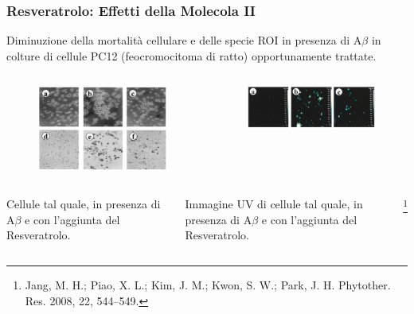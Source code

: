 \documentclass[9pt]{beamer}
\newcommand\blfootnote[1]{%
	\begingroup
	\renewcommand\thefootnote{}\footnote{#1}%
	\addtocounter{footnote}{-1}%
	\endgroup
}
\begin{document}
\begin{frame}
	\frametitle{Resveratrolo: Effetti della Molecola II}
	
	Diminuzione della mortalità cellulare e delle specie ROI in presenza di A$\beta$ in colture di cellule PC12 (feocromocitoma di ratto) opportunamente trattate.
	\begin{columns}
		\begin{column}{0.5\textwidth}
			\begin{figure}
				\includegraphics[width=\textwidth]{immagini/apo_resveratrolo.png}
			\end{figure}
		\end{column}
		\begin{column}{0.5\textwidth}
			\begin{figure}
				\includegraphics[width=\textwidth]{immagini/roi_resveratrolo.png}
			\end{figure}
		\end{column}
	\end{columns}
	\medskip
	\begin{columns}
		\begin{column}{0.5\textwidth}
			Cellule tal quale, in presenza di A$\beta$ e con l'aggiunta del Resveratrolo.
		\end{column}
		\begin{column}{0.5\textwidth}
			Immagine UV di cellule tal quale, in presenza di A$\beta$ e con l'aggiunta del Resveratrolo.
		\end{column}
		\blfootnote{Jang, M. H.; Piao, X. L.; Kim, J. M.; Kwon, S. W.; Park, J. H.
			Phytother. Res. 2008, 22, 544–549.}
	\end{columns}
	
\end{frame}
\end{document}
